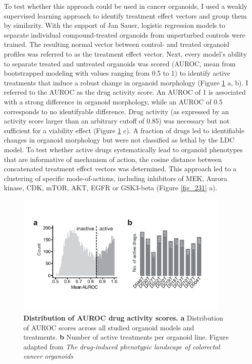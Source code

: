 \begin{flushleft}
\bigbreak
To test whether this approach could be used in cancer organoids, I used a weakly supervised learning approach to identify treatment effect vectors and group them by similarity. With the support of Jan Sauer, logistic regression models to separate individual compound-treated organoids from unperturbed controls were trained. The resulting normal vector between control- and treated organoid profiles was referred to as the treatment effect vector. Next, every model’s ability to separate treated and untreated organoids was scored (AUROC, mean from bootstrapped modeling with values ranging from 0.5 to 1) to identify active treatments that induce a robust change in organoid morphology (Figure \ref{fig_230} a, b). I referred to the AUROC as the drug activity score. An AUROC of 1 is associated with a strong difference in organoid morphology, while an AUROC of 0.5 corresponds to no identifyable difference. Drug activity (as expressed by an activity score larger than an arbitrary cutoff of 0.85) was necessary but not sufficient for a viability effect (Figure \ref{fig_230} c). A fraction of drugs led to identifiable changes in organoid morphology but were not classified as lethal by the LDC model. To test whether active drugs systematically lead to organoid phenotypes that are informative of mechanism of action, the cosine distance between concatenated treatment effect vectors was determined. This approach led to a clustering of specific mode-of-actions, including inhibitors of MEK, Aurora kinase, CDK, mTOR, AKT, EGFR or GSK3-beta (Figure \ref{fig_231} a). 

\begin{figure}[!h]
\centering
\includegraphics[width=300pt,
                height=\textheight,
                keepaspectratio]{figures/promise/pdf/fig_3_0_1.pdf}
\caption[Distribution of AUROC drug activity scores]{\textbf{Distribution of AUROC drug activity scores. a} Distribution of AUROC scores across all studied organoid models and treatments. \textbf{b} Number of active treatments per organoid line. Figure adapted from \textit{The drug-induced phenotypic landscape of colorectal cancer organoids} \citep{betgeDruginducedPhenotypicLandscape2022}}
\label{fig_230}
\end{figure}
\bigbreak


\end{flushleft}
